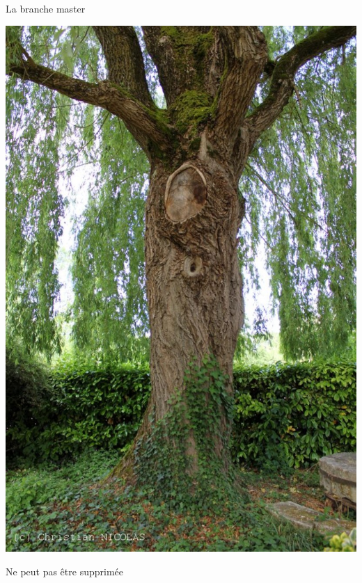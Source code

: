\begin{frame}{La branche master}
\begin{center}
\includegraphics[scale=0.2]{gizeux-saule-pleureur-tronc.jpg}

Ne peut pas être supprimée
\end{center}
\end{frame}

